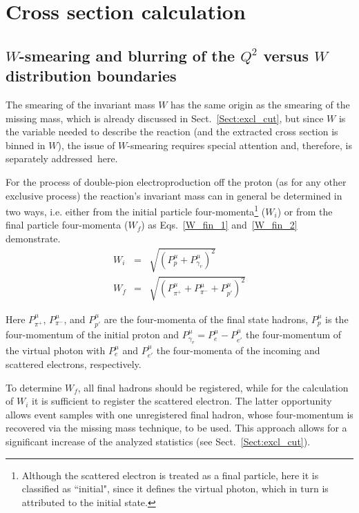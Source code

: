 \chapter{Cross section calculation}
\label{Sect:cr_sect}



\section{$W$-smearing and blurring of the $Q^{2}$ versus $W$ distribution boundaries}
\label{Sect:smearing_blurring}

The smearing of the invariant mass $W$ has the same origin as the smearing of the missing mass, which is already discussed in Sect.~\ref{Sect:excl_cut}, but since $W$ is the variable needed to describe the reaction (and the extracted cross section is binned in $W$), the issue of $W$-smearing requires special attention and, therefore, is separately addressed~here.


For the process of double-pion electroproduction off the proton (as for any other exclusive process) the reaction's invariant mass can in general be determined in two ways, i.e. either from the initial particle  four-momenta\footnote[1]{Although the scattered electron is treated as a final particle, here it is classified as ``initial", since it defines the virtual photon, which in turn is attributed to the initial state.} ($W_{i}$) or from the final particle  four-momenta ($W_{f}$) as Eqs.~\eqref{W_fin_1} and~\eqref{W_fin_2} demonstrate. 
\begin{eqnarray}
W_{i}&= & \sqrt{(P_{p}^{\mu}+P_{\gamma_{v}}^{\mu})^{2}} \label{W_fin_1} \\
W_{f}&= & \sqrt{(P_{\pi^{+}}^{\mu}+P_{\pi^{-}}^{\mu}+P_{p'}^{\mu})^{2}} \label{W_fin_2}
\end{eqnarray}

Here $P_{\pi^{+}}^{\mu}$, $P_{\pi^{-}}^{\mu}$, and $P_{p'}^{\mu}$ are the four-momenta of the final state hadrons, $P_{p}^{\mu}$ is the four-momentum of the initial proton and $P_{\gamma_{v}}^{\mu}=P_{e}^{\mu}-P_{e'}^{\mu}$ the four-momentum of the virtual photon with $P_{e}^{\mu}$ and $P_{e'}^{\mu}$ the four-momenta of the incoming and scattered electrons, respectively. 

To determine $W_{f}$, all final hadrons should be registered, while for the calculation of $W_{i}$ it is sufficient to register the scattered electron. The latter opportunity allows event samples with one unregistered final hadron, whose four-momentum is recovered via the missing mass technique, to be used. This approach allows for a significant increase of the analyzed statistics (see Sect.~\ref{Sect:excl_cut}).

